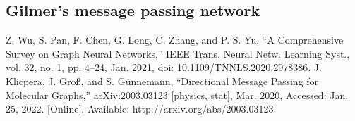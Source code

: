 \documentclass{article}
\begin{document}
\subsection{Gilmer's message passing network}



\begin{thebibliography}{99}
    Z. Wu, S. Pan, F. Chen, G. Long, C. Zhang, and P. S. Yu, “A Comprehensive Survey on Graph Neural Networks,” IEEE Trans. Neural Netw. Learning Syst., vol. 32, no. 1, pp. 4–24, Jan. 2021, doi: 10.1109/TNNLS.2020.2978386.
    J. Klicpera, J. Groß, and S. Günnemann, “Directional Message Passing for Molecular Graphs,” arXiv:2003.03123 [physics, stat], Mar. 2020, Accessed: Jan. 25, 2022. [Online]. Available: http://arxiv.org/abs/2003.03123
\end{thebibliography}
\end{document}
